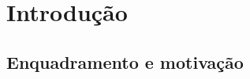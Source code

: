 \newcommand{\novathesis}{\emph{novathesis}}
\newcommand{\novathesisclass}{\texttt{novathesis.cls}}

\chapter{Introdução}
\label{cap1}
\section{Enquadramento e motivação}

